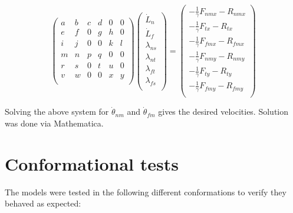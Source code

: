 \documentclass[
11pt, %
english, %
singlespacing, %
headsepline, %
chapterinoneline, %
]{MastersDoctoralThesis} %
\begin{document}
\[
\begin{pmatrix}
  a & b & c & d & 0 & 0\\
  e & f & 0 & g & h & 0\\
  i & j & 0 & 0 & k & l\\
  m & n & p & q & 0 & 0\\
  r & s & 0 & t & u & 0\\
  v & w & 0 & 0 & x & y\\
\end{pmatrix}
\begin{pmatrix}
    \dot{L}_{n}\\
    \dot{L}_{f}\\
    \lambda_{ns}\\
    \lambda_{nt}\\
    \lambda_{ft}\\
    \lambda_{fs}\\
  \end{pmatrix}
=
\begin{pmatrix}
  -\frac{1}{\gamma}F_{nmx} - R_{nmx}\\
  -\frac{1}{\gamma}F_{tx}  - R_{tx}\\
  -\frac{1}{\gamma}F_{fmx} - R_{fmx}\\
  -\frac{1}{\gamma}F_{nmy} - R_{nmy}\\
  -\frac{1}{\gamma}F_{ty}  - R_{ty}\\
  -\frac{1}{\gamma}F_{fmy} - R_{fmy}\\
\end{pmatrix}
\]

Solving the above system for $\dot{\theta}_{nm}$ and $\dot{\theta}_{fm}$ gives the desired velocities. Solution was done via Mathematica.

\chapter{Conformational tests}
\label{sec:conformational-tests}
The models were tested in the following different conformations to verify they behaved as expected:\\
\end{document}
